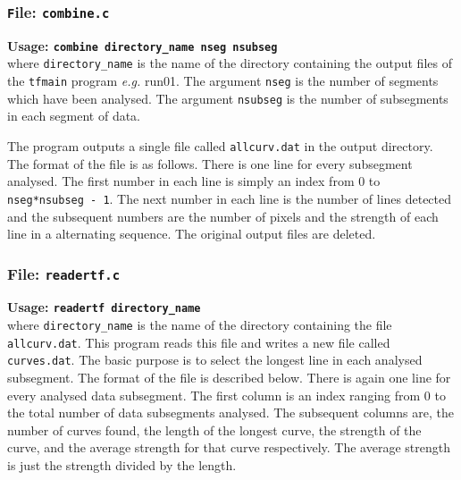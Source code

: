 \subsubsection{\texttt File:  {\tt combine.c}}

{\bf Usage: \tt combine directory\_name nseg nsubseg}\\
where  {\tt directory\_name} is the name of the directory containing the
output files of the {\tt tfmain} program {\em e.g.} run01. 
The argument {\tt nseg}
 is the number of segments which have been analysed. 
The argument {\tt nsubseg} is the number of subsegments in each segment of data.  

The program outputs a single file called {\tt allcurv.dat} in the
output directory. The format of the file is as follows. There is one
line for every subsegment analysed. The first number in each line is
simply an index from 0 to {\tt nseg*nsubseg - 1}. The next number in each
line is the number of lines detected and the subsequent numbers are
the number of pixels and the strength of each line in a alternating
sequence. The original output files are deleted.

\subsubsection{File: \tt readertf.c}
{\bf Usage: \tt readertf directory\_name}\\
where  {\tt directory\_name} is the name of the directory containing the
file {\tt allcurv.dat}.  This program reads this file and writes a new
file called {\tt curves.dat}. The basic purpose is to select the longest
line in each analysed subsegment. The format of the file is described
below. There is again one line for every analysed data subsegment. The
first column is an index ranging from 0 to the total number of data
subsegments analysed. The subsequent columns are, the number of curves
found, the length of the longest curve, the strength of the curve, and
the average strength for that curve respectively. 
The average strength is just the strength divided by the length.

